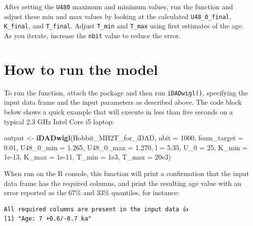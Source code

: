 \documentclass[]{elsarticle} %
\newenvironment{Shaded}{\begin{snugshade}}{\end{snugshade}}
\newcommand{\DataTypeTok}[1]{\textcolor[rgb]{0.13,0.29,0.53}{#1}}
\newcommand{\DecValTok}[1]{\textcolor[rgb]{0.00,0.00,0.81}{#1}}
\newcommand{\FloatTok}[1]{\textcolor[rgb]{0.00,0.00,0.81}{#1}}
\newcommand{\KeywordTok}[1]{\textcolor[rgb]{0.13,0.29,0.53}{\textbf{#1}}}
\newcommand{\NormalTok}[1]{#1}
\newcommand{\StringTok}[1]{\textcolor[rgb]{0.31,0.60,0.02}{#1}}
\begin{document}
After setting the \texttt{U480} maximum and minimum values, run the function and adjust these min and max values by looking at the calculated \texttt{U48\_0\_final}, \texttt{K\_final}, and \texttt{T\_final}. Adjust \texttt{T\_min} and \texttt{T\_max} using first estimates of the age. As you iterate, increase the \texttt{nbit} value to reduce the error.

\newpage

\hypertarget{how-to-run-the-model}{%
\section{How to run the model}\label{how-to-run-the-model}}

To run the function, attach the package and then run \texttt{iDADwigl()}, specifying the input data frame and the input parameters as described above. The code block below shows a quick example that will execute in less than five seconds on a typical 2.3 GHz Intel Core i5 laptop:

\begin{Shaded}
\begin{Highlighting}[]
\NormalTok{output <-}\StringTok{ }\KeywordTok{iDADwigl}\NormalTok{(Hobbit_MH2T_for_iDAD,}
                   \DataTypeTok{nbit =} \DecValTok{1000}\NormalTok{,}
                   \DataTypeTok{fsum_target =} \FloatTok{0.01}\NormalTok{,}
                   \DataTypeTok{U48_0_min =} \FloatTok{1.265}\NormalTok{,}
                   \DataTypeTok{U48_0_max =} \FloatTok{1.270}\NormalTok{,}
                   \DataTypeTok{l =} \FloatTok{5.35}\NormalTok{,}
                   \DataTypeTok{U_0 =} \DecValTok{25}\NormalTok{,}
                   \DataTypeTok{K_min =} \FloatTok{1e-13}\NormalTok{,}
                   \DataTypeTok{K_max =} \FloatTok{1e-11}\NormalTok{,}
                   \DataTypeTok{T_min =} \FloatTok{1e3}\NormalTok{,}
                   \DataTypeTok{T_max =} \FloatTok{20e3}\NormalTok{)}
\end{Highlighting}
\end{Shaded}

When run on the R console, this function will print a confirmation that the input data frame has the required columns, and print the resulting age value with an error reported as the 67\% and 33\% quantiles, for instance:

\begin{verbatim}
All required columns are present in the input data 👍
[1] "Age: 7 +0.6/-0.7 ka"
\end{verbatim}
\end{document}

